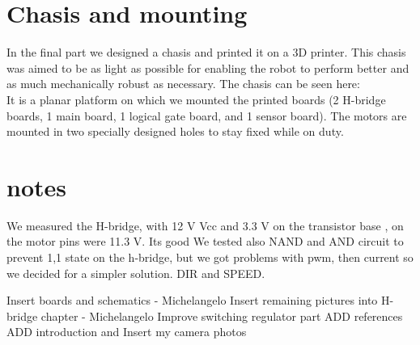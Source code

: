 \chapter{Chasis and mounting}
\label{chap:Chassis}

In the final part we designed a chasis and printed it on a 3D printer. This chasis
was aimed to be as light as possible for enabling the robot to perform better and as much mechanically robust as necessary. The chasis can be seen here:
\\It is a planar platform on which we mounted the printed boards (2 H-bridge boards, 1 main board, 1 logical gate board, and 1 sensor board). The motors are mounted in two specially designed holes to stay fixed while on duty. 

\chapter{notes}
We measured the H-bridge, with 12 V Vcc and 3.3 V on the transistor base , on the motor pins were 11.3 V. Its good
We tested also NAND and AND circuit to prevent 1,1 state on the h-bridge, but we got problems with pwm, then current so we decided for a simpler solution. DIR and SPEED.

Insert boards and schematics - Michelangelo
Insert remaining pictures into H-bridge chapter - Michelangelo
Improve switching regulator part
ADD references
ADD introduction and
Insert my camera photos
